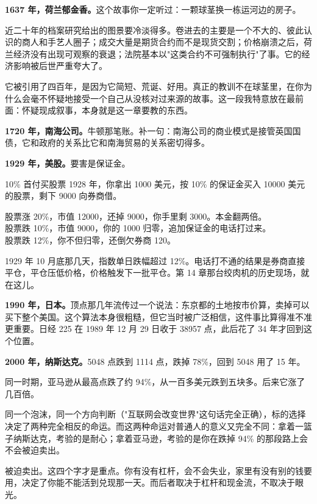 \textbf{1637 年，荷兰郁金香。}这个故事你一定听过：一颗球茎换一栋运河边的房子。

近二十年的档案研究给出的图景要冷淡得多。卷进去的主要是一个不大的、彼此认识的商人和手艺人圈子；成交大量是期货合约而不是现货交割；价格崩溃之后，荷兰经济没有出现可观察的衰退；法院基本以"这类合约不可强制执行"了事。它的经济影响被后世严重夸大了。

它被引用了四百年，是因为它简短、荒诞、好用。真正的教训不在球茎里，在你为什么会毫不怀疑地接受一个自己从没核对过来源的故事。这一段我特意放在最前面：怀疑现成叙事，本身就是这一章要教的东西。

\textbf{1720 年，南海公司。}牛顿那笔账。补一句：南海公司的商业模式是接管英国国债，它和政府的关系比它和南海贸易的关系密切得多。

\textbf{1929 年，美股。}要害是保证金。

\begin{egbox}{10\% 首付买股票}
1928 年，你拿出 1000 美元，按 10\% 的保证金买入 10000 美元的股票，剩下 9000 向券商借。

股票涨 20\%，市值 12000，还掉 9000，你手里剩 3000。本金翻两倍。\\ 股票跌 10\%，市值 9000，你的 1000 归零，追加保证金的电话打过来。\\ 股票跌 12\%，你不但归零，还倒欠券商 120。

1929 年 10 月底那几天，指数单日跌幅超过 12\%。电话打不通的结果是券商直接平仓，平仓压低价格，价格触发下一批平仓。第 14 章那台绞肉机的历史现场，就在这儿。

\end{egbox}

\textbf{1990 年，日本。}顶点那几年流传过一个说法：东京都的土地按市价算，卖掉可以买下整个美国。这个算法本身很粗糙，但它当时被广泛相信，这件事比算得准不准更重要。日经 225 在 1989 年 12 月 29 日收于 38957 点，此后花了 34 年才回到这个位置。

\textbf{2000 年，纳斯达克。}5048 点跌到 1114 点，跌掉 78\%，回到 5048 用了 15 年。

同一时期，亚马逊从最高点跌了约 94\%，从一百多美元跌到五块多。后来它涨了几百倍。

同一个泡沫，同一个方向判断（"互联网会改变世界"这句话完全正确），标的选择决定了两种完全相反的命运。而这两种命运对普通人的意义又完全不同：拿着一篮子纳斯达克，考验的是耐心；拿着亚马逊，考验的是你在跌掉 94\% 的那段路上会不会被迫卖出。

被迫卖出。这四个字才是重点。你有没有杠杆，会不会失业，家里有没有别的钱要用，决定了你能不能活到兑现那一天。而后者取决于杠杆和现金流，不取决于眼光。

